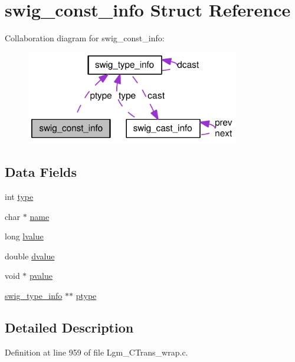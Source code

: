 \hypertarget{structswig__const__info}{
\section{swig\_\-const\_\-info Struct Reference}
\label{structswig__const__info}
}
Collaboration diagram for swig\_\-const\_\-info:\nopagebreak
\begin{figure}[H]
\begin{center}
\leavevmode
\includegraphics[width=265pt]{structswig__const__info__coll__graph}
\end{center}
\end{figure}
\subsection*{Data Fields}
\begin{CompactItemize}
\item 
int \hyperlink{structswig__const__info_c765329451135abec74c45e1897abf26}{type}
\item 
char $\ast$ \hyperlink{structswig__const__info_5ac083a645d964373f022d03df4849c8}{name}
\item 
long \hyperlink{structswig__const__info_d27f45c6331d8b6ac603e0cae235fb61}{lvalue}
\item 
double \hyperlink{structswig__const__info_b88920172b5a32b077bd95bb1f3d6f8e}{dvalue}
\item 
void $\ast$ \hyperlink{structswig__const__info_728d7ae5aaef6e9bdb0ec8a4e5c429b7}{pvalue}
\item 
\hyperlink{structswig__type__info}{swig\_\-type\_\-info} $\ast$$\ast$ \hyperlink{structswig__const__info_d55d59eb3cf7a2bb1fa92d92d42e782b}{ptype}
\end{CompactItemize}


\subsection{Detailed Description}


Definition at line 959 of file Lgm\_\-CTrans\_\-wrap.c.

